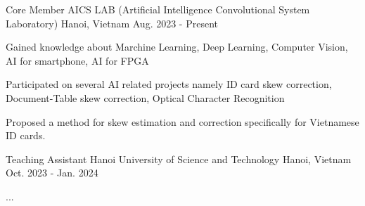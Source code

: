 

\begin{cventries}
\cventry
{Core Member} %
{AICS LAB (Artificial Intelligence Convolutional System Laboratory)} %
{Hanoi, Vietnam} %
{Aug. 2023 - Present} %
{
  \begin{cvitems} %
    \item {Gained knowledge about Marchine Learning, Deep Learning, Computer Vision, AI for smartphone, AI for FPGA}
    \item {Participated on several AI related projects namely ID card skew correction, Document-Table skew correction, Optical Character Recognition}
    \item Proposed a method for skew estimation and correction specifically for
    Vietnamese ID cards.
  \end{cvitems}
}

\cventry
{Teaching Assistant} %
{Hanoi University of Science and Technology} %
{Hanoi, Vietnam} %
{Oct. 2023 - Jan. 2024} %
{
  \begin{cvitems} %
    \item {...}
  \end{cvitems}
}
\end{cventries}
